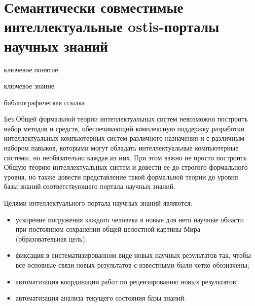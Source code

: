 \section{Семантически совместимые интеллектуальные ostis-порталы научных знаний}
{\label{sec_ostis_scientific_portal}} 

\begin{SCn}

\bigskip

\begin{scnrelfromlist}{ключевое понятие}
\end{scnrelfromlist}

\bigskip

\begin{scnrelfromlist}{ключевое знание}
\end{scnrelfromlist}

\bigskip

\begin{scnrelfromlist}{библиографическая ссылка}
\end{scnrelfromlist}

\end{SCn}


Без Общей формальной теории интеллектуальных систем невозможно построить набор методов и средств, обеспечивающий комплексную поддержку разработки интеллектуальных компьютерных систем различного назначения и с различным набором навыков, которыми могут обладать интеллектуальные компьютерные системы, но необязательно каждая из них. 
При этом важно не просто построить Общую теорию интеллектуальных систем и довести ее до строгого формального уровня, но также довести представление такой формальной теории до уровня базы знаний соответствующего портала научных знаний.

Целями интеллектуального портала научных знаний являются:
\begin{itemize}
    \item ускорение погружения каждого человека в новые для него научные области при постоянном сохранении общей целостной картины Мира (образовательная цель);
    \item фиксация в систематизированном виде новых научных результатов так, чтобы все основные связи новых результатов с известными были четко обозначены;
    \item автоматизация координации работ по рецензированию новых результатов;
    \item автоматизация анализа текущего состояния базы знаний.
\end{itemize}


